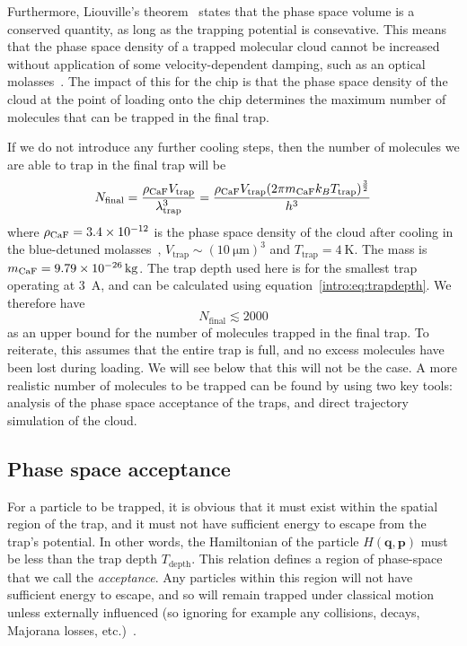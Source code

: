 Furthermore, Liouville's theorem~\cite{Landau1982, Hand1998} states that the
phase space volume is a conserved quantity, as long as the trapping potential
is consevative. This means that the phase space density of a trapped molecular
cloud cannot be increased without application of some velocity-dependent
damping, such as an optical molasses~\cite{Metcalf1999}. The impact of this for
the chip is that the phase space density of the cloud at the point of loading
onto the chip determines the maximum number of molecules that can be trapped in
the final trap.

If we do not introduce any further cooling steps, then the number of molecules
we are able to trap in the final trap will be
%
\begin{equation}
  N_\text{final} = \frac{\rho_\text{CaF{}}V_\text{trap}}
  {\lambda_\text{trap}^3} = \frac{\rho_\text{CaF{}} V_\text{trap}(2 \pi m_\text{CaF} k_B
  T_\text{trap})^\frac{3}{2}}{h^3}
  \label{design:eq:psd_N}
\end{equation}
%
where $\rho_\text{CaF{}} = 3.4\times10^{-12}$ is the phase space density of
the \CaF{} cloud after cooling in the blue-detuned molasses~\cite{Truppe2017},
$V_\text{trap}\sim(\SI{10}{\micro\meter})^3$ and
$T_\text{trap}=\SI{4}{\kelvin}$. The \CaF{} mass is
$m_\text{CaF{}}=\SI{9.79E-26}{\kilogram}$. The trap depth used here is for the
smallest trap operating at \SI{3}{\ampere}, and can be calculated using
equation~\ref{intro:eq:trapdepth}. We therefore have
%
\begin{equation}
  N_\text{final} \lesssim 2000
\end{equation}
%
as an upper bound for the number of molecules trapped in the final trap. To
reiterate, this assumes that the entire trap is full, and no excess molecules
have been lost during loading. We will see below that this will not be the
case. A more realistic number of molecules to be trapped can be found by using
two key tools: analysis of the phase space acceptance of the traps, and direct
trajectory simulation of the cloud.

\subsection{Phase space acceptance}


For a particle to be trapped, it is obvious that it must exist within the
spatial region of the trap, and it must not have sufficient energy to escape
from the trap's potential. In other words, the Hamiltonian of the particle
$H(\mathbf{q}, \mathbf{p})$ must be less than the trap depth $T_\text{depth}$.
This relation defines a region of phase-space that we call the
\emph{acceptance}. Any particles within this region will not have sufficient
energy to escape, and so will remain trapped under classical motion unless
externally influenced (so ignoring for example any collisions, decays, Majorana
losses, etc.)~\cite{Lichtenberg1969}.


